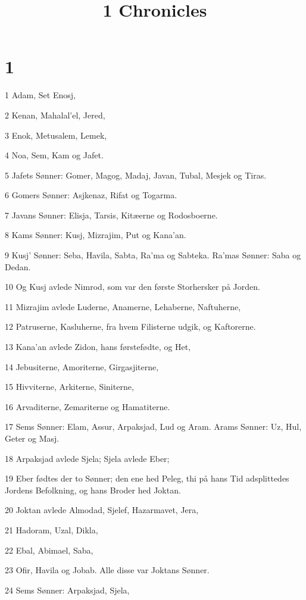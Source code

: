 

\title{1 Chronicles}


\chapter{1}

\par 1 Adam, Set Enosj,
\par 2 Kenan, Mahalal'el, Jered,
\par 3 Enok, Metusalem, Lemek,
\par 4 Noa, Sem, Kam og Jafet.
\par 5 Jafets Sønner: Gomer, Magog, Madaj, Javan, Tubal, Mesjek og Tiras.
\par 6 Gomers Sønner: Asjkenaz, Rifat og Togarma.
\par 7 Javans Sønner: Elisja, Tarsis, Kitæerne og Rodosboerne.
\par 8 Kams Sønner: Kusj, Mizrajim, Put og Kana'an.
\par 9 Kusj' Sønner: Seba, Havila, Sabta, Ra'ma og Sabteka. Ra'mas Sønner: Saba og Dedan.
\par 10 Og Kusj avlede Nimrod, som var den første Storhersker på Jorden.
\par 11 Mizrajim avlede Luderne, Anamerne, Lehaberne, Naftuherne,
\par 12 Patruserne, Kasluherne, fra hvem Filisterne udgik, og Kaftorerne.
\par 13 Kana'an avlede Zidon, hans førstefødte, og Het,
\par 14 Jebusiterne, Amoriterne, Girgasjiterne,
\par 15 Hivviterne, Arkiterne, Siniterne,
\par 16 Arvaditerne, Zemariterne og Hamatiterne.
\par 17 Sems Sønner: Elam, Assur, Arpaksjad, Lud og Aram. Arams Sønner: Uz, Hul, Geter og Masj.
\par 18 Arpaksjad avlede Sjela; Sjela avlede Eber;
\par 19 Eber fødtes der to Sønner; den ene hed Peleg, thi på hans Tid adsplittedes Jordens Befolkning, og hans Broder hed Joktan.
\par 20 Joktan avlede Almodad, Sjelef, Hazarmavet, Jera,
\par 21 Hadoram, Uzal, Dikla,
\par 22 Ebal, Abimael, Saba,
\par 23 Ofir, Havila og Jobab. Alle disse var Joktans Sønner.
\par 24 Sems Sønner: Arpaksjad, Sjela,
